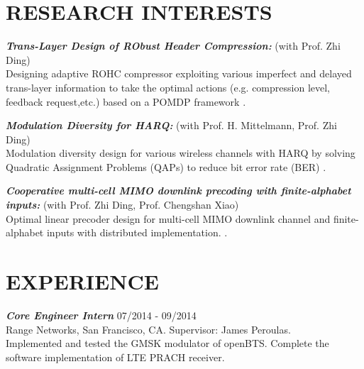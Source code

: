 \documentclass[margin]{res} %
\begin{document}
\begin{resume}
        \section{RESEARCH INTERESTS}
        {\sl\bf Trans-Layer Design of RObust Header Compression:} (with
        Prof. Zhi Ding)\\
        Designing adaptive ROHC compressor exploiting various imperfect and
        delayed trans-layer information to take the optimal actions (e.g.
        compression level, feedback request,etc.) based on a POMDP framework
        \cite{wu2017efficient, wu2016efficient}.
        
        
        {\sl \bf Modulation Diversity for HARQ:} (with Prof. H. Mittelmann, 
        Prof. Zhi Ding)\\
        Modulation diversity design for various wireless channels with
        HARQ by solving Quadratic Assignment Problems (QAPs) to reduce bit error
        rate (BER) \cite{wu2016modulation2,
        wu2016modulation1, wu2016statistical}.
        
        {\sl \bf Cooperative multi-cell MIMO downlink precoding with
        finite-alphabet inputs:} (with Prof. Zhi Ding, Prof. Chengshan Xiao)\\
        Optimal linear precoder design for multi-cell MIMO downlink channel
        and finite-alphabet inputs with distributed implementation.
        \cite{wu2015cooperative, wu2014cooperative}.
        
     
        \section{EXPERIENCE}
        
        {\sl\bf Core Engineer Intern} \hfill 07/2014 - 09/2014 \\
        Range Networks, San Francisco, CA. Supervisor: James Peroulas.\\
        Implemented and tested the GMSK modulator of openBTS. Complete the
        software implementation of LTE PRACH receiver.
        

\end{resume}
\end{document}
